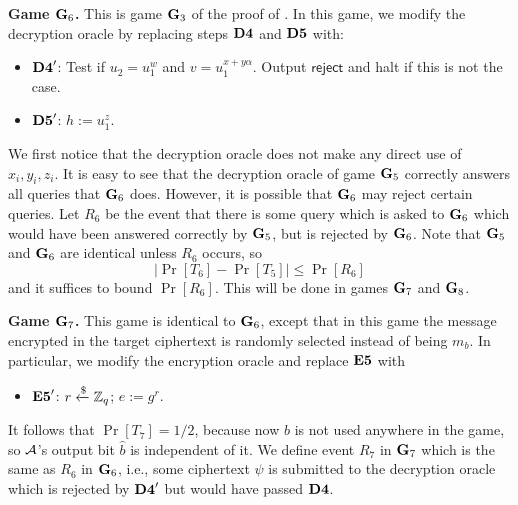 \textbf{Game $\mathbf{G}_6$.} This is game $\mathbf{G}_3$ of the proof of \cite{cs01}. In this game, we modify the decryption oracle by replacing steps $\mathbf{D4}$ and $\mathbf{D5}$ with:
\begin{itemize}
	\item[]$\mathbf{D4}'$: Test if $u_2 = u_1^w$ and $v = u_1^{x+y\alpha}$. Output $\mathsf{reject}$ and halt if this is not the case.
	\item[]$\mathbf{D5}'$: $h:= u_1^z$.
\end{itemize}
We first notice that the decryption oracle does not make any direct use of $x_i, y_i, z_i$. It is easy to see that the decryption oracle of game $\mathbf{G}_5$ correctly answers all queries that $\mathbf{G}_6$ does. However, it is possible that $\mathbf{G}_6$ may reject certain queries. Let $R_6$ be the event that there is some query which is asked to $\mathbf{G}_6$ which would have been answered correctly by $\mathbf{G}_5$, but is rejected by $\mathbf{G}_6$. Note that $\mathbf{G}_5$ and $\mathbf{G}_6$ are identical unless $R_6$ occurs, so $$|\Pr[T_6]-\Pr[T_5]|\leq\Pr[R_6]$$ and it suffices to bound $\Pr[R_6]$. This will be done in games $\mathbf{G}_7$ and $\mathbf{G}_8$.

%
%

\textbf{Game $\mathbf{G}_7$.} This game is identical to $\mathbf{G}_6$, except that in this game the message encrypted in the target ciphertext is randomly selected instead of being $m_b$. In particular, we modify the encryption oracle and replace $\mathbf{E5}$ with
\begin{itemize}
	\item[]$\mathbf{E5}'$: $r\xleftarrow{\$}\mathbb{Z}_q$; $e := g^r$.
\end{itemize}
It follows that $\Pr[T_7] = 1/2$, because now $b$ is not used anywhere in the game, so $\mathcal{A}$'s output bit $\hat{b}$ is independent of it. We define event $R_7$ in $\mathbf{G}_7$ which is the same as $R_6$ in $\mathbf{G}_6$, i.e., some ciphertext $\psi$ is submitted to the decryption oracle which is rejected by $\mathbf{D4}'$ but would have passed $\mathbf{D4}$.

